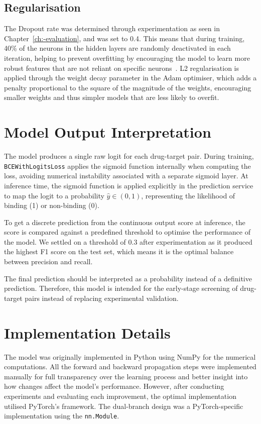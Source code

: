 \subsection{Regularisation}
The Dropout rate was determined through experimentation as seen in Chapter~\ref{ch:-evaluation}, and was set to 0.4.
This means that during training, 40\% of the neurons in the hidden layers are randomly deactivated in each iteration, helping to prevent overfitting by encouraging the model to learn more robust features that are not reliant on specific neurons~\citep{srivastava2014dropout}.
L2 regularisation is applied through the weight decay parameter in the Adam optimiser, which adds a penalty proportional to the square of the magnitude of the weights, encouraging smaller weights and thus simpler models that are less likely to overfit.

\section{Model Output Interpretation}
The model produces a single raw logit for each drug-target pair.
During training, \texttt{BCEWithLogitsLoss} applies the sigmoid function internally when computing the loss, avoiding numerical instability associated with a separate sigmoid layer.
At inference time, the sigmoid function is applied explicitly in the prediction service to map the logit to a probability $\hat{y} \in (0,1)$, representing the likelihood of binding (1) or non-binding (0).

To get a discrete prediction from the continuous output score at inference, the score is compared against a predefined threshold to optimise the performance of the model.
We settled on a threshold of 0.3 after experimentation as it produced the highest F1 score on the test set, which means it is the optimal balance between precision and recall.

The final prediction should be interpreted as a probability instead of a definitive prediction.
Therefore, this model is intended for the early-stage screening of drug-target pairs instead of replacing experimental validation.

\section{Implementation Details}
The model was originally implemented in Python using NumPy for the numerical computations.
All the forward and backward propagation steps were implemented manually for full transparency over the learning process and better insight into how changes affect the model's performance.
However, after conducting experiments and evaluating each improvement, the optimal implementation utilised PyTorch's framework.
The dual-branch design was a PyTorch-specific implementation using the \texttt{nn.Module}.



